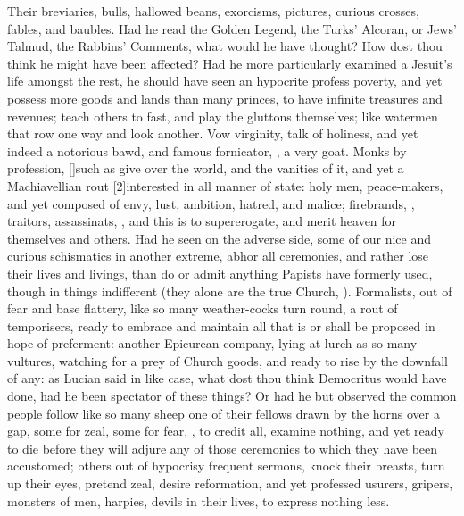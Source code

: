{Their breviaries, bulls, hallowed beans, exorcisms, pictures, curious
crosses, fables, and baubles. Had he read the Golden Legend, the Turks'
Alcoran, or Jews' Talmud, the Rabbins' Comments, what would he have
thought? How dost thou think he might have been affected? Had he more
particularly examined a Jesuit's life amongst the rest, he should have
seen an hypocrite profess poverty, and yet possess more goods and
lands than many princes, to have infinite treasures and revenues; teach
others to fast, and play the gluttons themselves; like watermen that
row one way and look another. Vow virginity, talk of holiness, and
yet indeed a notorious bawd, and famous fornicator, , a
very goat. Monks by profession, [\baselineskip]such as give over the world, and
the vanities of it, and yet a Machiavellian rout [2\baselineskip]interested in all
manner of state: holy men, peace-makers, and yet composed of envy,
lust, ambition, hatred, and malice; firebrands, ,
traitors, assassinats, , and this is to supererogate,
and merit heaven for themselves and others. Had he seen on the adverse
side, some of our nice and curious schismatics in another extreme,
abhor all ceremonies, and rather lose their lives and livings, than do
or admit anything Papists have formerly used, though in things
indifferent (they alone are the true Church, ). Formalists, out of fear and base flattery, like
so many weather-cocks turn round, a rout of temporisers, ready to
embrace and maintain all that is or shall be proposed in hope of
preferment: another Epicurean company, lying at lurch as so many
vultures, watching for a prey of Church goods, and ready to rise by the
downfall of any: as Lucian said in like case, what dost thou think
Democritus would have done, had he been spectator of these things?
Or had he but observed the common people follow like so many sheep one
of their fellows drawn by the horns over a gap, some for zeal, some for
fear, , to credit all, examine nothing,
and yet ready to die before they will adjure any of those ceremonies to
which they have been accustomed; others out of hypocrisy frequent
sermons, knock their breasts, turn up their eyes, pretend zeal, desire
reformation, and yet professed usurers, gripers, monsters of men,
harpies, devils in their lives, to express nothing less.

}
